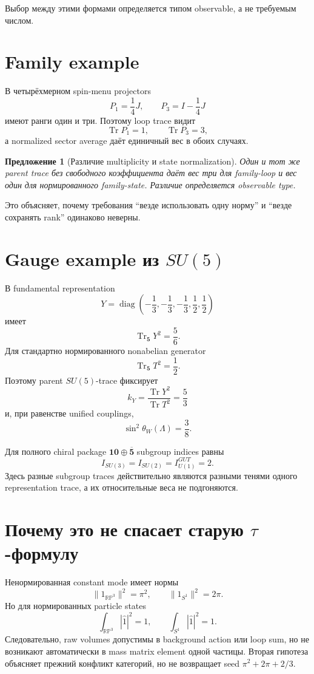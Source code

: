 \documentclass[12pt,a4paper]{article}
\newtheorem{proposition}{Предложение}
\begin{document}
Выбор между этими формами определяется типом observable, а не требуемым числом.

\section{Family example}

В четырёхмерном spin-menu projectors
\[
P_1=\frac14J,
\qquad
P_3=I-\frac14J
\]
имеют ранги один и три. Поэтому loop trace видит
\[
\operatorname{Tr}P_1=1,
\qquad
\operatorname{Tr}P_3=3,
\]
а normalized sector average даёт единичный вес в обоих случаях.

\begin{proposition}[Различие multiplicity и state normalization]
Один и тот же parent trace без свободного коэффициента даёт вес три для family-loop и вес один для нормированного family-state. Различие определяется observable type.
\end{proposition}

Это объясняет, почему требования ``везде использовать одну норму'' и ``везде сохранять rank'' одинаково неверны.

\section{Gauge example из \(SU(5)\)}

В fundamental representation
\[
Y=\operatorname{diag}\left(-\frac13,-\frac13,-\frac13,
\frac12,\frac12\right)
\]
имеет
\[
\operatorname{Tr}_{\mathbf5}Y^2=\frac56.
\]
Для стандартно нормированного nonabelian generator
\[
\operatorname{Tr}_{\mathbf5}T^2=\frac12.
\]
Поэтому parent \(SU(5)\)-trace фиксирует
\[
k_Y=\frac{\operatorname{Tr}Y^2}{\operatorname{Tr}T^2}
=\frac53
\]
и, при равенстве unified couplings,
\[
\sin^2\theta_W(\Lambda)=\frac38.
\]

Для полного chiral package \(\mathbf{10}\oplus\overline{\mathbf5}\) subgroup indices равны
\[
I_{SU(3)}=I_{SU(2)}=I_{U(1)}^{GUT}=2.
\]
Здесь разные subgroup traces действительно являются разными тенями одного representation trace, а их относительные веса не подгоняются.

\section{Почему это не спасает старую \(\tau\)-формулу}

Ненормированная constant mode имеет нормы
\[
\|1_{\mathbb{RP}^3}\|^2=\pi^2,
\qquad
\|1_{S^1}\|^2=2\pi.
\]
Но для нормированных particle states
\[
\int_{\mathbb{RP}^3}|\widehat1|^2=1,
\qquad
\int_{S^1}|\widehat1|^2=1.
\]
Следовательно, raw volumes допустимы в background action или loop sum, но не возникают автоматически в mass matrix element одной частицы. Вторая гипотеза объясняет прежний конфликт категорий, но не возвращает seed \(\pi^2+2\pi+2/3\).
\end{document}
